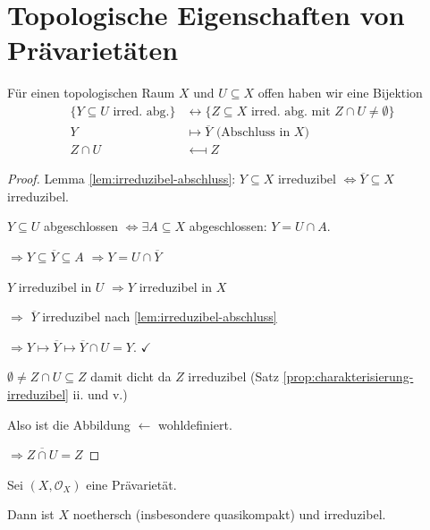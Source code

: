 
\section{Topologische Eigenschaften von Prävarietäten}
\label{sec:topologische-eigenschaften-von-praevarietaeten}
\begin{lem}
  \label{lem:bijektion-irred-teilraeume}
  Für einen topologischen Raum $X$ und $U\subseteq X$ offen haben
  wir eine Bijektion
  \begin{align*}
    \{Y\subseteq U\text{ irred. abg.}\} & \longleftrightarrow\{Z\subseteq X\text{ irred. abg. mit }Z\cap U\neq\emptyset\}\\
    Y & \longmapsto\overline{Y}\text{ (Abschluss in }X)\\
    Z\cap U & \longmapsfrom Z
  \end{align*}
\end{lem}
\begin{proof}
  Lemma \ref{lem:irreduzibel-abschluss}: $Y\subseteq X$ irreduzibel $\Leftrightarrow\overline{Y}\subseteq X$
  irreduzibel.

  $Y\subseteq U$ abgeschlossen $\Leftrightarrow\exists A\subseteq X$
  abgeschlossen: $Y=U\cap A$.

  $\Rightarrow Y\subseteq\overline{Y}\subseteq A$ $\Rightarrow Y=U\cap\overline{Y}$

  $Y$ irreduzibel in $U$ $\Rightarrow Y$ irreduzibel in $X$

  $\Rightarrow$ $\overline{Y}$ irreduzibel nach \ref{lem:irreduzibel-abschluss}

  $\Rightarrow Y\mapsto\overline{Y}\mapsto\overline{Y}\cap U=Y$. $\checkmark$

  $\emptyset\neq Z\cap U \subseteq Z$
  damit dicht da $Z$ irreduzibel (Satz \ref{prop:charakterisierung-irreduzibel} ii. und v.)

  Also ist die Abbildung $\leftarrow$ wohldefiniert.

  $\Rightarrow\overline{Z\cap U}=Z$ 
\end{proof}
\begin{prop}
  \label{prop:praevarietaeten-noethersch-irreduzibel}
  Sei $(X,\mathcal{O}_{X})$ eine Prävarietät.

  Dann ist $X$ noethersch (insbesondere quasikompakt) und irreduzibel.
\end{prop}
